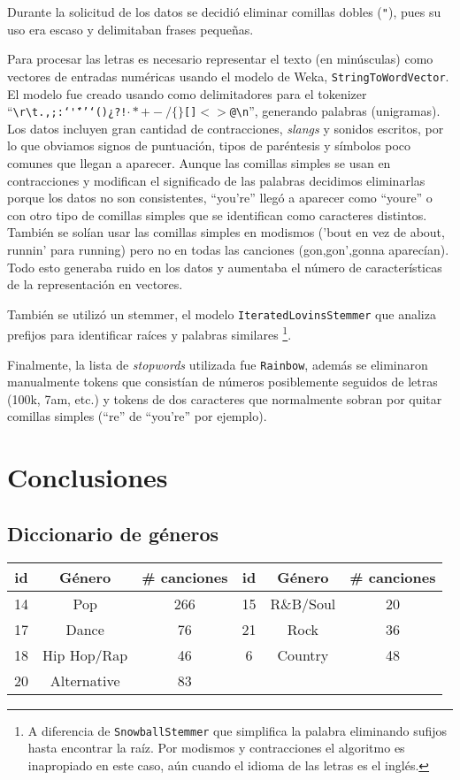 \documentclass[spanish,11pt,letterpaper]{article}
\begin{document}
Durante la solicitud de los datos se decidió eliminar comillas dobles (\texttt{"}),
pues su uso era escaso y delimitaban frases pequeñas.

Para procesar las letras
es necesario representar el texto (en minúsculas) como vectores de entradas numéricas usando
el modelo de Weka, \texttt{StringToWordVector}. El modelo fue creado usando como
delimitadores para el tokenizer
``\texttt{\textvisiblespace\textbackslash r\textbackslash t.,;:\char`\"'‘’`()¿?!$\cdot*+-/\{\}$[]$<>$@\textbackslash n}'', generando palabras (unigramas).
Los datos incluyen gran cantidad de contracciones, \textit{slangs} y sonidos escritos, por
lo que obviamos signos de puntuación, tipos de paréntesis y símbolos poco comunes
que llegan a aparecer. Aunque las comillas simples se usan en contracciones y
modifican el significado de las palabras decidimos eliminarlas porque los datos
no son consistentes, ``you're'' llegó a aparecer como ``you\textvisiblespace re''
o con otro tipo de comillas simples que se identifican como caracteres distintos.
También se solían usar las comillas simples en modismos ('bout
en vez de about, runnin' para running) pero no en todas las canciones (gon,gon',gonna
aparecían). Todo esto generaba ruido en los datos y aumentaba el número de
características de la representación en vectores.

También se utilizó un stemmer, el modelo \texttt{IteratedLovinsStemmer} que analiza
prefijos para identificar raíces y palabras similares%
\footnote{A diferencia de \texttt{SnowballStemmer} que simplifica
la palabra eliminando sufijos hasta encontrar la raíz. Por modismos
y contracciones el algoritmo es inapropiado en este caso, aún cuando el idioma
de las letras es el inglés.}.

Finalmente, la lista de \textit{stopwords} utilizada fue \texttt{Rainbow}, además
se eliminaron manualmente tokens que consistían de números posiblemente seguidos de letras
(100k, 7am, etc.) y tokens de dos caracteres que normalmente sobran por quitar
comillas simples (``re'' de ``you're'' por ejemplo).

\section{Conclusiones}

\begin{appendices}
\section{Diccionario de géneros}
\begin{center}
\begin{tabular}{|c|c|c||c|c|c|}
\hline
id & Género & \# canciones & id & Género & \# canciones\\
\hline
14 & Pop & 266 & 15 & R\&B/Soul & 20 \\
17 & Dance & 76 & 21 & Rock & 36 \\
18 & Hip Hop/Rap & 46 & 6 & Country & 48 \\
20 & Alternative & 83 & & & \\
\hline
\end{tabular}
\end{center}
\end{appendices}
\end{document}
